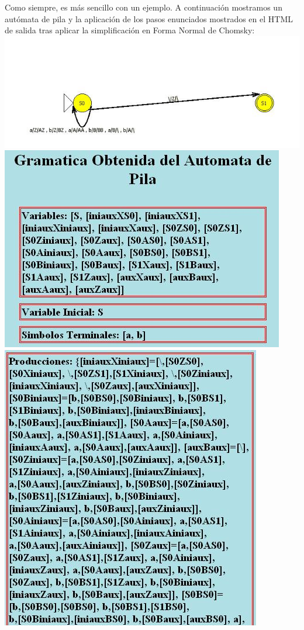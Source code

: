 \documentclass[12pt,a4paper,spanish]{book}
\begin{document}
Como siempre, es m\'as sencillo con un ejemplo. A continuaci\'on mostramos un aut\'omata de pila y la aplicaci\'on de los pasos enunciados mostrados en el HTML de salida tras aplicar la simplificaci\'on en Forma Normal de Chomsky:
\includegraphics{autparapasossimp.jpg} \\
\includegraphics{paso1simp.jpg} \\
\includegraphics{paso1simpprod.jpg} \\
\end{document}
